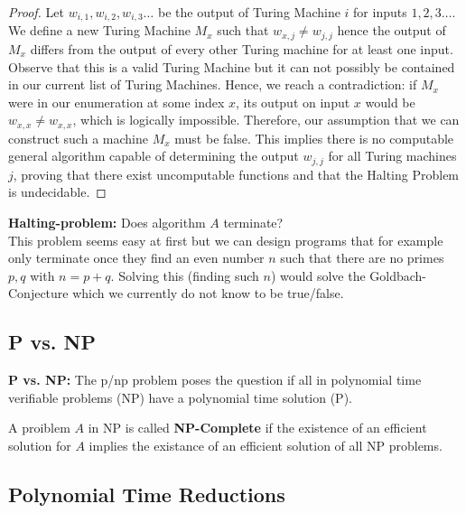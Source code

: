 \begin{proof}
    Let $w_{i,1}, w_{i,2}, w_{i,3} \dots$ be the output of Turing Machine $i$ for inputs $1,2,3 \dots$. 
    We define a new Turing Machine $M_x$ such that $w_{x,j} \neq w_{j,j}$ hence the output of $M_x$ differs from the output of every other Turing machine for at least one input. 
    Observe that this is a valid Turing Machine but it can not possibly be contained in our current list of Turing Machines. Hence, we reach a contradiction: if $M_x$ were in our enumeration at some index $x$, its output on input $x$ would be $w_{x,x} \neq w_{x,x}$, which is logically impossible. 
    Therefore, our assumption that we can construct such a machine $M_x$ must be false. This implies there is no computable general algorithm capable of determining the output $w_{j,j}$ for all Turing machines $j$, proving that there exist uncomputable functions and that the Halting Problem is undecidable.
\end{proof}

\begin{example}
    \textbf{Halting-problem:} Does algorithm $A$ terminate?\\
    This problem seems easy at first but we can design programs that for example only terminate once they find an even number $n$ such that there are no primes $p,q$ with $n = p+q$. Solving this (finding such $n$) would solve the Goldbach-Conjecture which we currently do not know to be true/false.
\end{example}

\subsection{P vs. NP}

\begin{definition}
    \textbf{P vs. NP:} The p/np problem poses the question if all in polynomial time verifiable problems (NP) have a polynomial time solution (P).
\end{definition}

\begin{definition}
    A proiblem $A$ in NP is called \textbf{NP-Complete} if the existence of an efficient solution for $A$ implies the existance of an efficient solution of all NP problems.
\end{definition}

\subsection{Polynomial Time Reductions}


